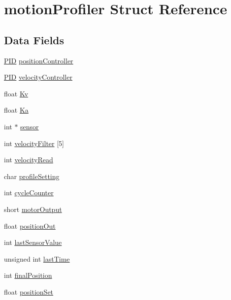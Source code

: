 \hypertarget{structmotion_profiler}{}\section{motion\+Profiler Struct Reference}
\label{structmotion_profiler}
\subsection*{Data Fields}
\begin{DoxyCompactItemize}
\item 
\hyperlink{struct_p_i_d}{P\+ID} \hyperlink{structmotion_profiler_a6af58c8bbf5ff2a9657b3003a6521db0}{position\+Controller}
\item 
\hyperlink{struct_p_i_d}{P\+ID} \hyperlink{structmotion_profiler_a731ffc5dde37d1e3bb373311c7f84d61}{velocity\+Controller}
\item 
float \hyperlink{structmotion_profiler_a9dd79979f873707ff49614e3d2b05371}{Kv}
\item 
float \hyperlink{structmotion_profiler_af7e0be223ca11bc5e95332a223a5a410}{Ka}
\item 
int $\ast$ \hyperlink{structmotion_profiler_ac45c58330bcdae28978c77a6cfde8f72}{sensor}
\item 
int \hyperlink{structmotion_profiler_aa5d8685398a6a8a736ee930be4de1d64}{velocity\+Filter} \mbox{[}5\mbox{]}
\item 
int \hyperlink{structmotion_profiler_abab91ecaedaa0da8ff8efb499269ff0a}{velocity\+Read}
\item 
char \hyperlink{structmotion_profiler_af1c26d55aae953850de4497090f96033}{profile\+Setting}
\item 
int \hyperlink{structmotion_profiler_a7568fe510550cda7e14714cb1940ca8f}{cycle\+Counter}
\item 
short \hyperlink{structmotion_profiler_a596a165e0e260065d862d418d84c7f6b}{motor\+Output}
\item 
float \hyperlink{structmotion_profiler_ae3c797ea09227486617f837045db17ce}{position\+Out}
\item 
int \hyperlink{structmotion_profiler_a0f19b669e85c8c71ac80e985351be173}{last\+Sensor\+Value}
\item 
unsigned int \hyperlink{structmotion_profiler_ab17786ea0ccd57d2b527d06143e22c15}{last\+Time}
\item 
int \hyperlink{structmotion_profiler_a49d3333b9018fe1b2454e56c30a72311}{final\+Position}
\item 
float \hyperlink{structmotion_profiler_ae45782f37eaa20c9ccb117874abc7ff2}{position\+Set}

\end{DoxyCompactItemize}
